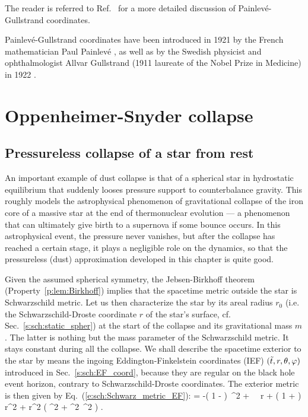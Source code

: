 The reader is referred to Ref.~\cite{MarteP01} for a more detailed
discussion of Painlevé-Gullstrand coordinates.

\begin{hist}
Painlevé-Gullstrand coordinates have been introduced in 1921 by the
French mathematician
Paul Painlevé \cite{Painl1921}, as well as by the Swedish physicist and ophthalmologist
Allvar Gullstrand (1911 laureate of the Nobel Prize in Medicine) in 1922 \cite{Gulls1922}.
\end{hist}

\section{Oppenheimer-Snyder collapse} \label{s:lem:OS}

\subsection{Pressureless collapse of a star from rest}

An important example of dust collapse is that of
a spherical star in hydrostatic equilibrium that suddenly looses
pressure support to counterbalance gravity. This roughly models the astrophysical
phenomenon of gravitational collapse
of the iron core of a massive star at the
end of thermonuclear evolution --- a phenomenon that can ultimately give birth
to a supernova if some bounce occurs. In this astrophysical event, the
pressure never vanishes, but after the collapse has reached a certain stage, it
plays a negligible role on the dynamics, so that the pressureless (dust) approximation
developed in this chapter is quite good.

Given the assumed spherical symmetry, the Jebsen-Birkhoff theorem (Property~\ref{p:lem:Birkhoff})
implies that the spacetime metric outside the star
is Schwarzschild metric.
Let us then characterize the star by its areal radius $r_0$
(i.e. the Schwarzschild-Droste coordinate $r$ of the star's surface, cf. Sec.~\ref{s:sch:static_spher})
at the start of the collapse and its gravitational mass $m$. The latter
is nothing but the mass parameter of the Schwarzschild metric. It stays
constant during all the collapse.
We shall describe the spacetime exterior
to the star by means the ingoing Eddington-Finkelstein coordinates (IEF)
$({\tilde t}, r, \theta,\varphi)$
introduced in Sec.~\ref{s:sch:EF_coord}, because they are regular on the
black hole event horizon, contrary to Schwarzschild-Droste coordinates.
The exterior metric is then given by Eq.~(\ref{e:sch:Schwarz_metric_EF}):
\be \label{e:lem:OS:exterior_metric}
     =
            -\left( 1 -  \right)\, \dd \ti^2
            +  \, \dd \ti \, \dd r
            + \left( 1 +  \right)\, \dd r^2
        + r^2 \left( \dd\th^2 + \sin^2\th\, \dd\ph^2 \right) .
\ee

